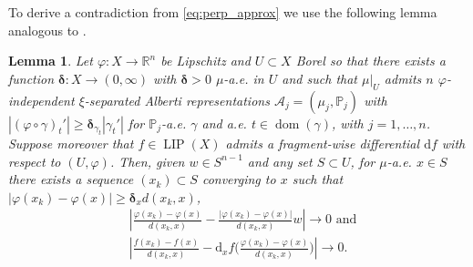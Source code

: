 \documentclass{amsart}
\newtheorem{lemma}[theorem]{Lemma}
\numberwithin{equation}{section}
\newcommand{\R}{\mathbb{R}}
\renewcommand{\P}{\mathbb{P}}
\newcommand{\LIP}{\operatorname{LIP}}
\newcommand{\dom}{\operatorname{dom}}
\newcommand{\ud}{\mathrm {d}}
\begin{document}
To derive a contradiction from \eqref{eq:perp_approx} we use the following lemma analogous to \cite[Lemma 9.1]{bate15}.
\begin{lemma}\label{lem:zigzagfrag}
Let $\varphi:X\to \R^n$ be Lipschitz and $U\subset X$ Borel so that there exists a function $\bm\delta:X\to (0,\infty)$ with $\bm\delta>0$ $\mu$-a.e. in $U$ and such that $\mu|_U$ admits $n$ $\varphi$-independent $\xi$-separated Alberti representations $\mathcal{A}_j=(\mu_j, \P_j)$ with $|(\varphi\circ\gamma)_t'|\ge \bm\delta_{\gamma_t}|\gamma_t'|$ for $\P_j$-a.e. $\gamma$ and a.e. $t\in \dom(\gamma)$, with $j=1,\dots,n$. Suppose moreover that $f\in \LIP(X)$ admits a fragment-wise differential $\ud f$ with respect to $(U,\varphi)$. Then, given $w\in S^{n-1}$ and any set $S\subset U$, for $\mu$-a.e. $x\in S$ there exists a sequence $(x_k)\subset S$ converging to $x$ such that $|\varphi(x_k)-\varphi(x)|\ge \bm\delta_x d(x_k,x)$,
\begin{align*}
    &\left|\frac{\varphi(x_k)-\varphi(x)}{d(x_k,x)}-\frac{|\varphi(x_k)-\varphi(x)|}{d(x_k,x)}w\right|\to 0\textrm{ and} \\
    &\left|\frac{f(x_k)-f(x)}{d(x_k,x)}-\ud_xf\bigg(\frac{\varphi(x_k)-\varphi(x)}{d(x_k,x)}\bigg)\right|\to 0.
\end{align*}
\end{lemma}
\end{document}

